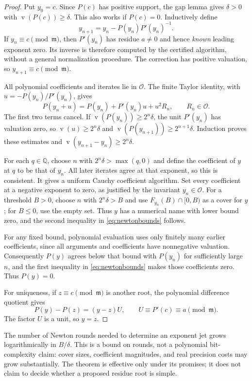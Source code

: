\documentclass[11pt,letterpaper]{article}
\numberwithin{equation}{section}
\theoremstyle{definition}
\theoremstyle{remark}
\newcommand{\Q}{\mathbb Q}
\newcommand{\val}{\operatorname{v}}
\newcommand{\Oh}{\mathcal O}
\newcommand{\mh}{\mathfrak m}
\begin{document}
\begin{proof}
Put $y_0=c$. Since $P(c)$ has positive support, the gap lemma gives
$\delta>0$ with $\val(P(c))\ge\delta$. This also works if $P(c)=0$.
Inductively define
\begin{equation}\label{eq:newton}
 y_{n+1}=y_n-P(y_n)P'(y_n)^{-1}.
\end{equation}
If $y_n\equiv c\pmod\mh$, then $P'(y_n)$ has residue $a\ne0$ and hence
\emph{known} leading exponent zero. Its inverse is therefore computed by
the certified algorithm, without a general normalization procedure.
The correction has positive valuation, so $y_{n+1}\equiv c\pmod\mh$.

All polynomial coefficients and iterates lie in $\Oh$. The finite Taylor
identity, with $u=-P(y_n)/P'(y_n)$, gives
\[
 P(y_n+u)=P(y_n)+P'(y_n)u+u^2R_n,
 \qquad R_n\in\Oh.
\]
The first two terms cancel. If $\val(P(y_n))\ge2^n\delta$, the unit
$P'(y_n)$ has valuation zero, so $\val(u)\ge2^n\delta$ and
$\val(P(y_{n+1}))\ge2^{n+1}\delta$. Induction proves these estimates
and $\val(y_{n+1}-y_n)\ge2^n\delta$.

For each $q\in\Q$, choose $n$ with $2^n\delta>\max(q,0)$ and define the
coefficient of $y$ at $q$ to be that of $y_n$. All later iterates agree at
that exponent, so this is consistent. It gives a uniform Cauchy coefficient
algorithm. Set every coefficient at a negative exponent to zero, as
justified by the invariant $y_n\in\Oh$. For a threshold $B>0$, choose
$n$ with $2^n\delta>B$ and use $F_{y_n}(B)\cap[0,B)$ as a cover for $y$;
for $B\le0$, use the empty set. Thus $y$ has a numerical name with lower
bound zero, and the second inequality in \eqref{eq:newtonbounds} follows.

For any fixed bound, polynomial evaluation uses only finitely many earlier
coefficients, since all arguments and coefficients have nonnegative
valuation. Consequently $P(y)$ agrees below that bound with $P(y_n)$ for
sufficiently large $n$, and the first inequality in
\eqref{eq:newtonbounds} makes those coefficients zero. Thus $P(y)=0$.

For uniqueness, if $z\equiv c\pmod\mh$ is another root, the polynomial
difference quotient gives
\[
 P(y)-P(z)=(y-z)U,\qquad U\equiv P'(c)\equiv a\pmod\mh.
\]
The factor $U$ is a unit, so $y=z$.
\end{proof}

The number of Newton rounds needed to determine an exponent jet grows
logarithmically in $B/\delta$. This is a bound on rounds, not a polynomial
bit-complexity claim: cover sizes, coefficient magnitudes, and real
precision costs may grow substantially. The theorem is effective only
under its promises; it does not claim to decide whether a proposed residue
root is simple.
\end{document}
